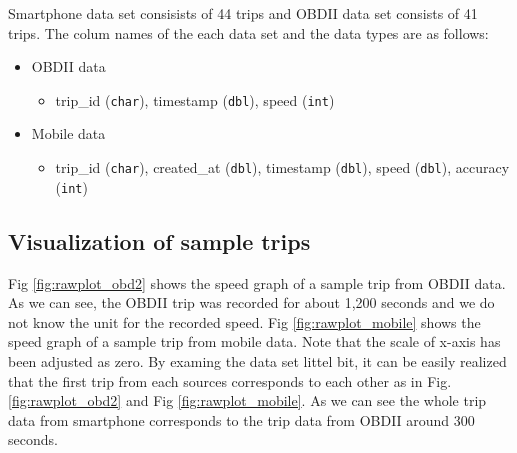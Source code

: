 \documentclass[letterpaper,9pt,twocolumn,twoside,]{pinp}
\providecommand{\tightlist}{%
  \setlength{\itemsep}{0pt}\setlength{\parskip}{0pt}}
\begin{document}
Smartphone data set consisists of 44 trips and OBDII data set consists
of 41 trips. The colum names of the each data set and the data types are
as follows:

\begin{itemize}
\tightlist
\item
  OBDII data

  \begin{itemize}
  \tightlist
  \item
    trip\_id (\texttt{char}), timestamp (\texttt{dbl}), speed
    (\texttt{int})
  \end{itemize}
\item
  Mobile data

  \begin{itemize}
  \tightlist
  \item
    trip\_id (\texttt{char}), created\_at (\texttt{dbl}), timestamp
    (\texttt{dbl}), speed (\texttt{dbl}), accuracy (\texttt{int})
  \end{itemize}
\end{itemize}

\hypertarget{visualization-of-sample-trips}{%
\subsection{Visualization of sample
trips}\label{visualization-of-sample-trips}}

Fig \ref{fig:rawplot_obd2} shows the speed graph of a sample trip from
OBDII data. As we can see, the OBDII trip was recorded for about 1,200
seconds and we do not know the unit for the recorded speed. Fig
\ref{fig:rawplot_mobile} shows the speed graph of a sample trip from
mobile data. Note that the scale of x-axis has been adjusted as zero. By
examing the data set littel bit, it can be easily realized that the
first trip from each sources corresponds to each other as in Fig.
\ref{fig:rawplot_obd2} and Fig \ref{fig:rawplot_mobile}. As we can see
the whole trip data from smartphone corresponds to the trip data from
OBDII around 300 seconds.
\end{document}
